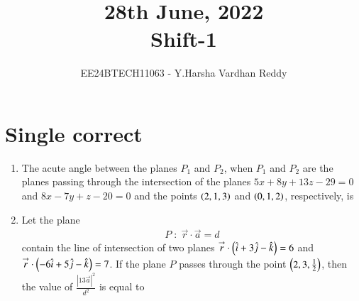 \documentclass[journal,,12pt,onecolumn]{IEEEtran}
\theoremstyle{remark}
\begin{document}

\vspace{3cm}

\title{28th June, 2022\\Shift-1}
\author{EE24BTECH11063 - Y.Harsha Vardhan Reddy}
\maketitle

\bigskip

\renewcommand{\thefigure}{\theenumi}
\renewcommand{\thetable}{\theenumi}

\section*{Single correct}
\begin{enumerate}
    \item The acute angle between the planes $P_1$ and $P_2$, when $P_1$ and $P_2$ are the planes passing through the intersection of the planes $5x+8y+13z-29=0$ and $8x-7y+z-20=0$ and the points $\left(2,1,3\right)$ and $\left(0,1,2\right)$, respectively, is
    \begin{enumerate}
        \end{enumerate}
        \bigskip
        \item Let the plane 
        \begin{align*}
        P\;:\;\overset{\rightarrow}{r}\cdot\overset{\rightarrow}{a}=d
        \end{align*}
        contain the line of intersection of two planes $\overset{\rightarrow}{r}\cdot \left(\hat{i}+3\hat{j}-\hat{k}\right)=6$ and $\overset{\rightarrow}{r}\cdot \left(-6\hat{i}+5\hat{j}-\hat{k}\right)=7$. If the plane $P$ passes through the point $\left(2,3,\frac{1}{2}\right)$, then the value of $\frac{|13\overset{\rightarrow}{a}|^2}{d^2}$ is equal to
        \begin{enumerate}
\end{enumerate}
\end{enumerate}
\end{document}
